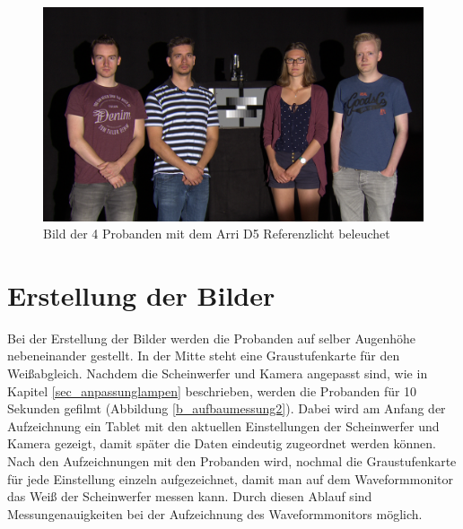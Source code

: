 \begin{figure}[H]     %
\centering
\includegraphics[width=1.0\textwidth]{bilder/umfrage1} 
\caption {Bild der 4 Probanden mit dem Arri D5 Referenzlicht beleuchet}\label{b_umfrage1}
\end{figure}

 
\section{Erstellung der Bilder}
\label{sec_erstellungbilder}
Bei der Erstellung der Bilder werden die Probanden auf selber Augenhöhe nebeneinander gestellt. In der Mitte steht eine Graustufenkarte für den Weißabgleich. Nachdem die Scheinwerfer und Kamera angepasst sind, wie in Kapitel \ref{sec_anpassunglampen} beschrieben, werden die Probanden für 10 Sekunden gefilmt (Abbildung \ref{b_aufbaumessung2}). Dabei wird am Anfang der Aufzeichnung ein Tablet mit den aktuellen Einstellungen der Scheinwerfer und Kamera gezeigt, damit später die Daten eindeutig zugeordnet werden können.\\
Nach den Aufzeichnungen mit den Probanden wird, nochmal die Graustufenkarte für jede Einstellung einzeln aufgezeichnet, damit man auf dem Waveformmonitor das Weiß der Scheinwerfer messen kann. Durch diesen Ablauf sind Messungenauigkeiten bei der Aufzeichnung des Waveformmonitors möglich. 

